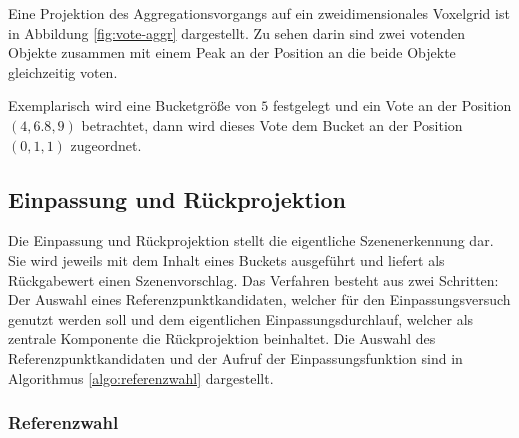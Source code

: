 Eine Projektion des Aggregationsvorgangs auf ein zweidimensionales Voxelgrid ist in Abbildung \vref{fig:vote-aggr} dargestellt.
Zu sehen darin sind zwei votenden Objekte zusammen mit einem Peak an der Position an die beide Objekte gleichzeitig voten.

Exemplarisch wird eine Bucketgröße von $5$ festgelegt und ein Vote an der Position $(4, 6.8, 9)$ betrachtet, dann wird dieses Vote dem Bucket an der Position $(0, 1, 1)$ zugeordnet.

\subsection{Einpassung und Rückprojektion}\label{ch:einpassung}

Die Einpassung und Rückprojektion stellt die eigentliche Szenenerkennung dar.
Sie wird jeweils mit dem Inhalt eines Buckets ausgeführt und liefert als Rückgabewert einen Szenenvorschlag.
Das Verfahren besteht aus zwei Schritten:
Der Auswahl eines Referenzpunktkandidaten, welcher für den Einpassungsversuch genutzt werden soll und dem eigentlichen Einpassungsdurchlauf, welcher als zentrale Komponente die Rückprojektion beinhaltet.
Die Auswahl des Referenzpunktkandidaten und der Aufruf der Einpassungsfunktion sind in Algorithmus \vref{algo:referenzwahl} dargestellt.

\subsubsection{Referenzwahl}

